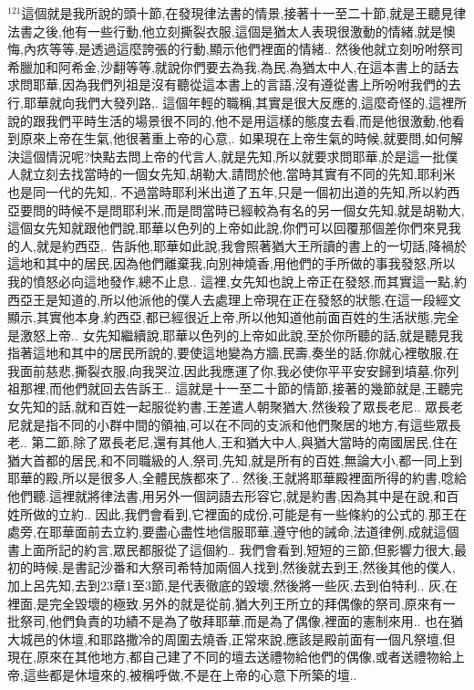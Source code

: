 \documentclass{book}
\begin{document}
$^{121}$這個就是我所說的頭十節,在發現律法書的情景,接著十一至二十節,就是王聽見律法書之後,他有一些行動,他立刻撕裂衣服,這個是猶太人表現很激動的情緒,就是懊悔,內疚等等,是透過這麼誇張的行動,顯示他們裡面的情緒..
然後他就立刻吩咐祭司希臘加和阿希金,沙翻等等,就說你們要去為我,為民,為猶太中人,在這本書上的話去求問耶華,因為我們列祖是沒有聽從這本書上的言語,沒有遵從書上所吩咐我們的去行,耶華就向我們大發列路,.
這個年輕的職稱,其實是很大反應的,這麼奇怪的,這裡所說的跟我們平時生活的場景很不同的,他不是用這樣的態度去看,而是他很激動,他看到原來上帝在生氣,他很著重上帝的心意,.
如果現在上帝生氣的時候,就要問,如何解決這個情況呢?快點去問上帝的代言人,就是先知,所以就要求問耶華,於是這一批僕人就立刻去找當時的一個女先知,胡勒大,請問於他,當時其實有不同的先知,耶利米也是同一代的先知,.
不過當時耶利米出道了五年,只是一個初出道的先知,所以約西亞要問的時候不是問耶利米,而是問當時已經較為有名的另一個女先知,就是胡勒大,這個女先知就跟他們說,耶華以色列的上帝如此說,你們可以回覆那個差你們來見我的人,就是約西亞,.
告訴他,耶華如此說,我會照著猶大王所讀的書上的一切話,降禍於這地和其中的居民,因為他們離棄我,向別神燒香,用他們的手所做的事我發怒,所以我的憤怒必向這地發作,總不止息..
這裡,女先知也說上帝正在發怒,而其實這一點,約西亞王是知道的,所以他派他的僕人去處理上帝現在正在發怒的狀態,在這一段經文顯示,其實他本身,約西亞,都已經很近上帝,所以他知道他前面百姓的生活狀態,完全是激怒上帝..
女先知繼續說,耶華以色列的上帝如此說,至於你所聽的話,就是聽見我指著這地和其中的居民所說的,要使這地變為方牆,民壽,奏坐的話,你就心裡敬服,在我面前慈悲,撕裂衣服,向我哭泣,因此我應運了你,我必使你平平安安歸到墳墓,你列祖那裡,而他們就回去告訴王..
這就是十一至二十節的情節,接著的幾節就是,王聽完女先知的話,就和百姓一起服從約書,王差遣人朝聚猶大,然後殺了眾長老尼..
眾長老尼就是指不同的小群中間的領袖,可以在不同的支派和他們聚居的地方,有這些眾長老..
第二節,除了眾長老尼,還有其他人,王和猶大中人,與猶大當時的南國居民,住在猶大首都的居民,和不同職級的人,祭司,先知,就是所有的百姓,無論大小,都一同上到耶華的殿,所以是很多人,全體民族都來了..
然後,王就將耶華殿裡面所得的約書,唸給他們聽.這裡就將律法書,用另外一個詞語去形容它,就是約書,因為其中是在說,和百姓所做的立約..
因此,我們會看到,它裡面的成份,可能是有一些條約的公式的.那王在處旁,在耶華面前去立約,要盡心盡性地信服耶華,遵守他的誡命,法道律例,成就這個書上面所記的約言,眾民都服從了這個約..
我們會看到,短短的三節,但影響力很大,最初的時候,是書記沙番和大祭司希特加兩個人找到,然後就去到王,然後其他的僕人,加上呂先知,去到23章1至3節,是代表徹底的毀壞,然後將一些灰,去到伯特利..
灰,在裡面,是完全毀壞的極致.另外的就是從前,猶大列王所立的拜偶像的祭司,原來有一批祭司,他們負責的功績不是為了敬拜耶華,而是為了偶像,裡面的憲制來用..
也在猶大城邑的休壇,和耶路撒冷的周圍去燒香,正常來說,應該是殿前面有一個凡祭壇,但現在,原來在其他地方,都自己建了不同的壇去送禮物給他們的偶像,或者送禮物給上帝,這些都是休壇來的,被稱呼做,不是在上帝的心意下所築的壇..
\end{document}
